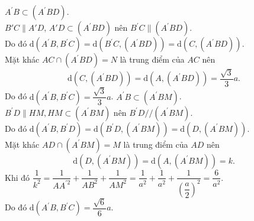 \begin{ex}
{\begin{itemchoice}
			\itemch  $A^{\prime} B \subset\left(A^{\prime} B D\right)$.\\
			$B'C\parallel A'D$, $A'D  \subset\left(A^{\prime} B D\right)$ nên $B^{\prime} C \parallel\left(A^{\prime} B D\right)$.\\
			Do đó $\mathrm{d}\left(A^{\prime} B,  B^{\prime} C\right)=\mathrm{d}\left(B^{\prime} C,\left(A^{\prime} B D\right)\right)=\mathrm{d}\left(C,\left(A^{\prime} B D\right)\right)$.\\
			Mặt khác $A C \cap\left(A^{\prime} B D\right)=N$ là trung điểm của $A  C$ nên
			\[\mathrm{d}\left(C,\left(A^{\prime} B  D\right)\right)=\mathrm{d}\left(A,\left(A^{\prime} B D\right)\right)=\dfrac{\sqrt{3}}{3} a.\]
			Do đó $\mathrm{d}\left(A^{\prime}  B, B^{\prime} C\right)=\dfrac{\sqrt{3}}{3} a$.
			\itemch  $A^{\prime} B \subset\left(A^{\prime} B M\right)$.\\
			$B^{\prime} D\parallel H M, H M \subset\left(A^{\prime} B  M\right)$ nên $B^{\prime} D / /\left(A^{\prime} B M\right)$.\\
			Do đó  $\mathrm{d}\left(A^{\prime} B, B^{\prime} D\right)=\mathrm{d}\left(B^{\prime} D,\left(A^{\prime} B M\right)\right)=\mathrm{d}\left(D,\left(A^{\prime} B M\right)\right)$.\\
			Mặt khác $A D \cap\left(A^{\prime} B M\right)=M$ là trung điểm của $A D$  nên \[\mathrm{d}\left(D,\left(A^{\prime} B M\right)\right)=\mathrm{d}\left(A,\left(A^{\prime} B M\right)\right)=k.\]
			Khi đó  $\dfrac{1}{k^{2}}=\dfrac{1}{A A^{\prime 2}}+\dfrac{1}{A B^{2}}+\dfrac{1}{A M^{2}}=\dfrac{1}{a^{2}}+\dfrac{1}{a^{2}}+\dfrac{1}{\left(\dfrac{a}{2}\right)^{2}}=\dfrac{6}{a^{2}}$.\\
			Do đó  $\mathrm{d}\left(A^{\prime} B, B^{\prime} C\right)=\dfrac{\sqrt{6}}{6} a$.
		\end{itemchoice}
	} 
\end{ex}

